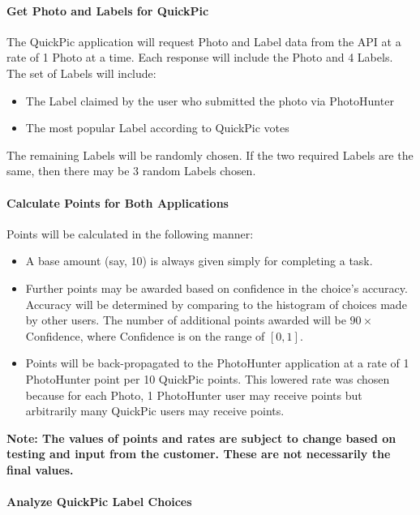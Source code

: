 \documentclass{article}
\begin{document}
\paragraph{Get Photo and Labels for QuickPic}

The QuickPic application will request Photo and Label data from the API at a
rate of 1 Photo at a time.  Each response will include the Photo and 4 Labels.
The set of Labels will include:

\begin{itemize}
  \item The Label claimed by the user who submitted the photo via PhotoHunter
  \item The most popular Label according to QuickPic votes
\end{itemize}

The remaining Labels will be randomly chosen.  If the two required Labels are
the same, then there may be 3 random Labels chosen.

\paragraph{Calculate Points for Both Applications}

Points will be calculated in the following manner:

\begin{itemize}
  \item A base amount (say, 10) is always given simply for completing a task.
  \item Further points may be awarded based on confidence in the choice's
    accuracy.  Accuracy will be determined by comparing to the histogram of
    choices made by other users.  The number of additional points awarded will
    be $90 \times$ Confidence, where Confidence is on the range of
    $[0, 1]$.

  \item Points will be back-propagated to the PhotoHunter application at a rate
    of 1 PhotoHunter point per 10 QuickPic points.  This lowered rate was
    chosen because for each Photo, 1 PhotoHunter user may receive points but
    arbitrarily many QuickPic users may receive points.
\end{itemize}

\textbf{Note: The values of points and rates are subject to change based on
  testing and input from the customer.  These are not necessarily the final
values.}

\paragraph{Analyze QuickPic Label Choices}
\end{document}
